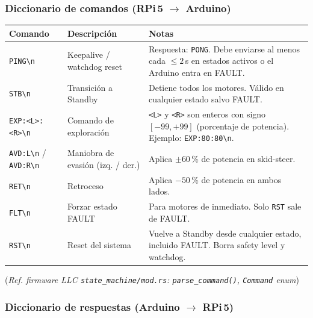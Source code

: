 \subsubsection{Diccionario de comandos (RPi\,5 $\rightarrow$ Arduino)}

\begin{center}
\small
\renewcommand{\arraystretch}{1.3}
\begin{tabular}{p{3.4cm}p{4.5cm}p{5.5cm}}
\toprule
\textbf{Comando} & \textbf{Descripción} & \textbf{Notas} \\
\midrule
\verb|PING\n| &
  Keepalive / watchdog reset &
  Respuesta: \verb|PONG|. Debe enviarse al menos cada $\leq 2$\,s
  en estados activos o el Arduino entra en FAULT. \\

\verb|STB\n| &
  Transición a Standby &
  Detiene todos los motores. Válido en cualquier estado salvo FAULT. \\

\verb|EXP:<L>:<R>\n| &
  Comando de exploración &
  \verb|<L>| y \verb|<R>| son enteros con signo $[-99, +99]$
  (porcentaje de potencia). Ejemplo: \verb|EXP:80:80\n|.\\

\verb|AVD:L\n| / \verb|AVD:R\n| &
  Maniobra de evasión (izq. / der.) &
  Aplica $\pm 60$\,\% de potencia en skid-steer. \\

\verb|RET\n| &
  Retroceso &
  Aplica $-50$\,\% de potencia en ambos lados. \\

\verb|FLT\n| &
  Forzar estado FAULT &
  Para motores de inmediato. Solo \verb|RST| sale de FAULT. \\

\verb|RST\n| &
  Reset del sistema &
  Vuelve a Standby desde cualquier estado, incluido FAULT.
  Borra safety level y watchdog. \\
\bottomrule
\end{tabular}
\end{center}
(\emph{Ref. firmware LLC \texttt{state\_machine/mod.rs}: \texttt{parse\_command()}, \texttt{Command} enum})

\subsubsection{Diccionario de respuestas (Arduino $\rightarrow$ RPi\,5)}

